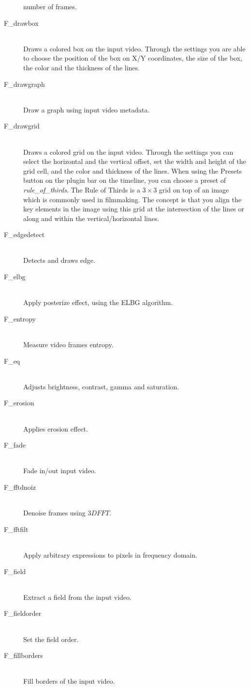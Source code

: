 \begin{description}
  number of frames.
\item [F\_drawbox]~\\Draws a colored box on the input
  video. Through the settings you are able to choose the position of
  the box on X/Y coordinates, the size of the box, the color and the
  thickness of the lines.
\item [F\_drawgraph]~\\Draw a graph using input video
  metadata.
\item [F\_drawgrid]~\\Draws a colored grid on the input
  video. Through the settings you can select the horizontal and the
  vertical offset, set the width and height of the grid cell, and the
  color and thickness of the lines. When using the Presets button on
  the plugin bar on the timeline, you can choose a preset of
  \textit{rule\_of\_thirds}. The Rule of Thirds is a $3\times3$ grid
  on top of an image which is commonly used in filmmaking. The concept
  is that you align the key elements in the image using this grid at
  the intersection of the lines or along and within the
  vertical/horizontal lines.
\item [F\_edgedetect]~\\Detects and draws edge.
\item [F\_elbg]~\\Apply posterize effect, using the ELBG
  algorithm.
\item [F\_entropy]~\\Measure video frames entropy.
\item [F\_eq]~\\Adjusts brightness, contrast, gamma and
  saturation.
\item [F\_erosion]~\\Applies erosion effect.
\item [F\_fade]~\\Fade in/out input video.
\item [F\_fftdnoiz]~\\Denoise frames using $3D FFT$.
\item [F\_fftfilt]~\\Apply arbitrary expressions to pixels in
  frequency domain.
\item [F\_field]~\\Extract a field from the input video.
\item [F\_fieldorder]~\\Set the field order.
\item [F\_fillborders]~\\Fill borders of the input video.

\end{description}
